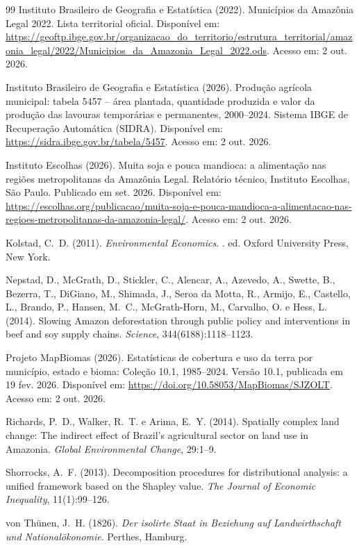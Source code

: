 \documentclass[11pt,a4paper]{article}
\begin{document}
\begin{thebibliography}{99}
Instituto Brasileiro de Geografia e Estatística (2022).
\newblock Municípios da Amazônia Legal 2022.
\newblock Lista territorial oficial. Disponível em: \url{https://geoftp.ibge.gov.br/organizacao_do_territorio/estrutura_territorial/amazonia_legal/2022/Municipios_da_Amazonia_Legal_2022.ods}. Acesso em: 2 out. 2026.

Instituto Brasileiro de Geografia e Estatística (2026).
\newblock Produção agrícola municipal: tabela 5457 -- área plantada, quantidade produzida e valor da produção das lavouras temporárias e permanentes, 2000--2024.
\newblock Sistema IBGE de Recuperação Automática (SIDRA). Disponível em: \url{https://sidra.ibge.gov.br/tabela/5457}. Acesso em: 2 out. 2026.

Instituto Escolhas (2026).
\newblock Muita soja e pouca mandioca: a alimentação nas regiões metropolitanas da Amazônia Legal.
\newblock Relatório técnico, Instituto Escolhas, São Paulo. Publicado em set. 2026. Disponível em: \url{https://escolhas.org/publicacao/muita-soja-e-pouca-mandioca-a-alimentacao-nas-regioes-metropolitanas-da-amazonia-legal/}. Acesso em: 2 out. 2026.

Kolstad, C.~D. (2011).
\newblock \textit{Environmental Economics}.
. ed. Oxford University Press, New York.

Nepstad, D., McGrath, D., Stickler, C., Alencar, A., Azevedo, A., Swette, B., Bezerra, T., DiGiano, M., Shimada, J., Seroa da Motta, R., Armijo, E., Castello, L., Brando, P., Hansen, M.~C., McGrath-Horn, M., Carvalho, O. e Hess, L. (2014).
\newblock Slowing Amazon deforestation through public policy and interventions in beef and soy supply chains.
\newblock \textit{Science}, 344(6188):1118--1123.

Projeto MapBiomas (2026).
\newblock Estatísticas de cobertura e uso da terra por município, estado e bioma: Coleção 10.1, 1985--2024.
\newblock Versão 10.1, publicada em 19 fev. 2026. Disponível em: \url{https://doi.org/10.58053/MapBiomas/SJZOLT}. Acesso em: 2 out. 2026.

Richards, P.~D., Walker, R.~T. e Arima, E.~Y. (2014).
\newblock Spatially complex land change: The indirect effect of Brazil's agricultural sector on land use in Amazonia.
\newblock \textit{Global Environmental Change}, 29:1--9.

Shorrocks, A.~F. (2013).
\newblock Decomposition procedures for distributional analysis: a unified framework based on the Shapley value.
\newblock \textit{The Journal of Economic Inequality}, 11(1):99--126.

von Thünen, J.~H. (1826).
\newblock \textit{Der isolirte Staat in Beziehung auf Landwirthschaft und Nationalökonomie}.
\newblock Perthes, Hamburg.

\end{thebibliography}
\end{document}
